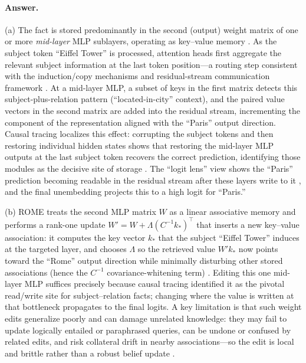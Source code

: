 \documentclass[11pt]{article}
\begin{document}
\paragraph{Answer.}
(a) The fact is stored predominantly in the second (output) weight matrix of
one or more \emph{mid-layer} MLP sublayers, operating as key--value memory
\citep{geva2021kvmemories}. As the subject token ``Eiffel Tower'' is processed,
attention heads first aggregate the relevant subject information at the last
token position---a routing step consistent with the induction/copy mechanisms
and residual-stream communication framework
\citep{olsson2022induction,elhage2021mathematical}. At a mid-layer MLP, a
subset of keys in the first matrix detects this subject-plus-relation pattern
(``located-in-city'' context), and the paired value vectors in the second
matrix are added into the residual stream, incrementing the component of the
representation aligned with the ``Paris'' output direction. Causal tracing
localizes this effect: corrupting the subject tokens and then restoring
individual hidden states shows that restoring the mid-layer MLP outputs at the
last subject token recovers the correct prediction, identifying those modules
as the decisive site of storage \citep{meng2022rome}. The ``logit lens'' view
shows the ``Paris'' prediction becoming readable in the residual stream after
these layers write to it \citep{geva2022promoting}, and the final unembedding
projects this to a high logit for ``Paris.''

(b) ROME treats the second MLP matrix $W$ as a linear associative memory and
performs a rank-one update $W' = W + \Lambda (C^{-1} k_*)^{\top}$ that inserts a
new key--value association: it computes the key vector $k_*$ that the subject
``Eiffel Tower'' induces at the targeted layer, and chooses $\Lambda$ so the
retrieved value $W' k_*$ now points toward the ``Rome'' output direction while
minimally disturbing other stored associations (hence the $C^{-1}$
covariance-whitening term) \citep{meng2022rome}. Editing this one mid-layer MLP
suffices precisely because causal tracing identified it as the pivotal
read/write site for subject--relation facts; changing where the value is
written at that bottleneck propagates to the final logits. A key limitation is
that such weight edits generalize poorly and can damage unrelated knowledge:
they may fail to update logically entailed or paraphrased queries, can be
undone or confused by related edits, and risk collateral drift in nearby
associations---so the edit is local and brittle rather than a robust belief
update \citep{meng2022rome,dai2022knowledgeneurons}.
\end{document}
